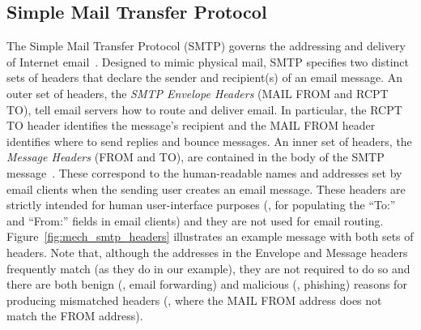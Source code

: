 \subsection{Simple Mail Transfer Protocol}
The Simple Mail Transfer Protocol (SMTP) governs the addressing and
delivery of Internet email~\cite{rfc5321}.  Designed to mimic physical
mail, SMTP specifies two distinct sets of headers that declare the
sender and recipient(s) of an email message.  An outer set of headers,
the \emph{SMTP Envelope Headers} (\textsc{MAIL FROM} and \textsc{RCPT
  TO}), tell email servers how to route and deliver email. In
particular, the \textsc{RCPT TO} header identifies the message's
recipient and the \textsc{MAIL FROM} header identifies where to send
replies and bounce messages.  An inner set of headers, the
\emph{Message Headers} (\textsc{FROM} and \textsc{TO}), are contained
in the body of the SMTP message~\cite{rfc5322}.  These correspond to the
human-readable names and addresses set by email clients when the
sending user creates an email message.  These headers are strictly
intended for human user-interface purposes (\ie, for populating the
``To:'' and ``From:'' fields in email clients) and they are not used
for email routing.  Figure~\ref{fig:mech_smtp_headers} illustrates an
example message with both sets of headers.  Note that, although the
addresses in the Envelope and Message headers frequently match (as
they do in our example), they are not required to do so and there are both
benign (\eg, email forwarding) and malicious (\eg, phishing) reasons
for producing mismatched headers (\eg, where the \textsc{MAIL FROM}
address does not match the \textsc{FROM} address).


